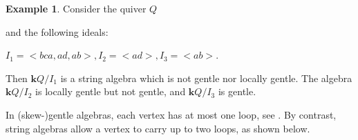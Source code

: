 \documentclass[11pt]{amsart}
\numberwithin{equation}{section}
\theoremstyle{definition}
\newtheorem{example}[theorem]{Example}
\begin{document}
\begin{example}\label{ex:string-gentle algebra}
	Consider the quiver $Q$
	\begin{center}
	\end{center}
	and the following ideals:
	\begin{center}
		$I_{1}=<bca,ad,ab>, I_{2}=<ad> , I_{3}=<ab>$.
	\end{center}
	Then $\mathbf{k}Q/I_{1}$ is a string algebra which is not gentle nor locally gentle. The algebra $\mathbf{k}Q/I_{2}$ is locally gentle but not gentle, and $\mathbf{k}Q/I_{3}$ is gentle.
	
\end{example}

In (skew-)gentle algebras, each vertex has at most one loop, see \cite[Lemma 1.2]{HZZ23}. By contrast, string algebras allow a vertex to carry up to two loops, as shown below.
\end{document}
